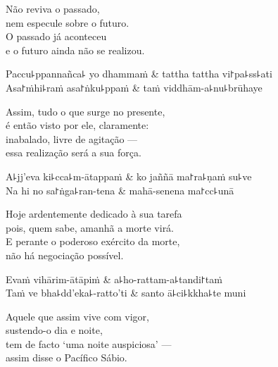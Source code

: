 \begin{english}
  Não reviva o passado,\\
  nem especule sobre o futuro.\\
  O passado já aconteceu\\
  e o futuro ainda não se realizou.
\end{english}

\begin{twochants}
  Paccu꜕ppannañca꜕ yo dhammaṁ & tattha tattha vi꜓pa꜕ss꜕ati \\
  Asa꜓ṁhi꜕raṁ asa꜓ṅku꜕ppaṁ & taṁ viddhām-a꜕nu꜕brūhaye \\
\end{twochants}

\begin{english}
  Assim, tudo o que surge no presente,\\
  é então visto por ele, claramente:\\
  inabalado, livre de agitação ---\\
  essa realização será a sua força.
\end{english}

\begin{twochants}
  A꜕jj'eva ki꜕cca꜕m-ātappaṁ & ko jaññā ma꜓ra꜕ṇaṁ su꜕ve \\
  Na hi no sa꜓ṅga꜕ran-tena & mahā-senena ma꜓cc꜕unā \\
\end{twochants}

\begin{english}
  Hoje ardentemente dedicado à sua tarefa\\
  pois, quem sabe, amanhã a morte virá.\\
  E perante o poderoso exército da morte,\\
  não há negociação possível.
\end{english}

\clearpage

\begin{twochants}
  Evaṁ vihārim-ātāpiṁ & a꜕ho-rattam-a꜕tandi꜓taṁ \\
  Taṁ ve bha꜕dd'eka꜕-ratto'ti & santo ā꜕ci꜕kkha꜕te muni \\
\end{twochants}

\begin{english}
  Aquele que assim vive com vigor,\\
  sustendo-o dia e noite,\\
  tem de facto `uma noite auspiciosa' ---\\
  assim disse o Pacífico Sábio.
\end{english}

